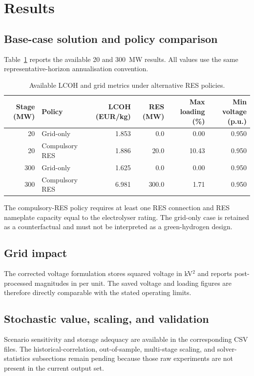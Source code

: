 \section{Results}
\subsection{Base-case solution and policy comparison}
Table~\ref{tab:policy-comparison} reports the available 20 and 300~MW results. All values use the same representative-horizon annualisation convention.

\begin{table}[t]
\centering
\caption{Available LCOH and grid metrics under alternative RES policies.}
\label{tab:policy-comparison}
\begin{tabular}{r l r r r r}
\toprule
Stage (MW) & Policy & LCOH (EUR/kg) & RES (MW) & Max loading (\%) & Min voltage (p.u.) \\ \midrule
20 & Grid-only & 1.853 & 0.0 & 0.00 & 0.950 \\
20 & Compulsory RES & 1.886 & 20.0 & 10.43 & 0.950 \\
300 & Grid-only & 1.625 & 0.0 & 0.00 & 0.950 \\
300 & Compulsory RES & 6.981 & 300.0 & 1.71 & 0.950 \\
\bottomrule
\end{tabular}
\end{table}

The compulsory-RES policy requires at least one RES connection and RES nameplate capacity equal to the electrolyser rating. The grid-only case is retained as a counterfactual and must not be interpreted as a green-hydrogen design.

\subsection{Grid impact}
The corrected voltage formulation stores squared voltage in kV$^2$ and reports post-processed magnitudes in per unit. The saved voltage and loading figures are therefore directly comparable with the stated operating limits.

\subsection{Stochastic value, scaling, and validation}
Scenario sensitivity and storage adequacy are available in the corresponding CSV files. The historical-correlation, out-of-sample, multi-stage scaling, and solver-statistics subsections remain pending because those raw experiments are not present in the current output set.
